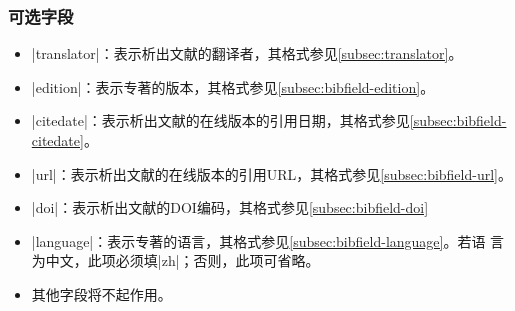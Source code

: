 \subsubsection{可选字段}

\begin{itemize}
\item |translator|：表示析出文献的翻译者，其格式参见\ref{subsec:translator}。
\item |edition|：表示专著的版本，其格式参见\ref{subsec:bibfield-edition}。
\item |citedate|：表示析出文献的在线版本的引用日期，其格式参见\ref{subsec:bibfield-citedate}。
\item |url|：表示析出文献的在线版本的引用URL，其格式参见\ref{subsec:bibfield-url}。
\item |doi|：表示析出文献的DOI编码，其格式参见\ref{subsec:bibfield-doi}
\item |language|：表示专著的语言，其格式参见\ref{subsec:bibfield-language}。若语
  言为中文，此项必须填|zh|；否则，此项可省略。
\item 其他字段将不起作用。
\end{itemize}

